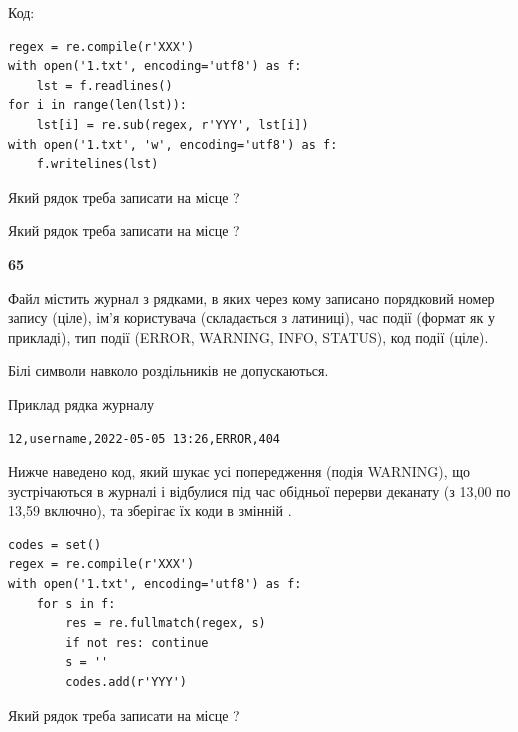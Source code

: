 Код:



\begin{verbatim}
regex = re.compile(r'XXX')
with open('1.txt', encoding='utf8') as f:
    lst = f.readlines()
for i in range(len(lst)):
    lst[i] = re.sub(regex, r'YYY', lst[i])
with open('1.txt', 'w', encoding='utf8') as f:
    f.writelines(lst)
\end{verbatim}







Який рядок треба записати на місце  ?\par
\vspace{5mm}


Який рядок треба записати на місце  ?\par


\newpage

{\begin {center}\textbf{ 65}\end {center}}\par
Файл  містить журнал з рядками, в яких через кому записано поряд\-ко\-вий номер запису (ціле), ім'я користувача (складається з латиниці), час події (фор\-мат як у прикладі), тип події (ERROR, WARNING, INFO, STATUS), код події (ціле).

Білі символи навколо роздільників не допускаються.

Приклад рядка журналу



\begin{verbatim}
12,username,2022-05-05 13:26,ERROR,404
\end{verbatim}


Нижче наведено код, який шукає усі попередження (подія WARNING), що зустрі\-ча\-ються в журналі і відбулися під час обідньої перерви деканату (з 13,00 по 13,59 включно), та зберігає їх коди в змінній .



\begin{verbatim}
codes = set()
regex = re.compile(r'XXX')
with open('1.txt', encoding='utf8') as f:
    for s in f:
        res = re.fullmatch(regex, s)
        if not res: continue
        s = ''
        codes.add(r'YYY')
\end{verbatim}







Який рядок треба записати на місце  ?\par
\vspace{5mm}


